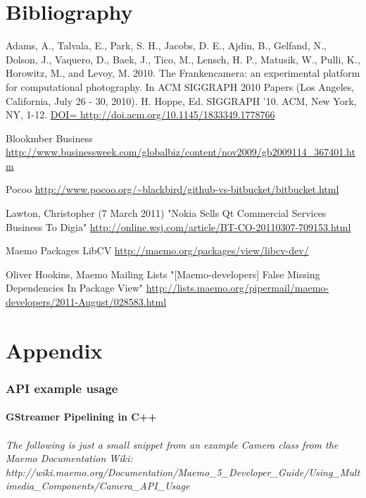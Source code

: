 \documentclass[11pt]{article} %
\begin{document}
\part{Bibliography}
\begin{thebibliography}{9}

 Adams, A., Talvala, E., Park, S. H., Jacobs, D. E., Ajdin, B., Gelfand, N., Dolson, J., Vaquero, D., Baek, J., Tico, M., Lensch, H. P., Matusik, W., Pulli, K., Horowitz, M., and Levoy, M.
2010. The Frankencamera: an experimental platform for computational photography.
In ACM SIGGRAPH 2010 Papers (Los Angeles, California, July 26 - 30, 2010).
H. Hoppe, Ed. SIGGRAPH '10. ACM, New York, NY, 1-12.
\url{DOI= http://doi.acm.org/10.1145/1833349.1778766}

 Blookmber Business
\url{http://www.businessweek.com/globalbiz/content/nov2009/gb2009114_367401.htm}

 Pocoo
\url{http://www.pocoo.org/~blackbird/github-vs-bitbucket/bitbucket.html}

 Lawton, Christopher (7 March 2011)
"Nokia Sells Qt Commercial Services Business To Digia"
\url{http://online.wsj.com/article/BT-CO-20110307-709153.html}

 Maemo Packages
LibCV
\url{http://maemo.org/packages/view/libcv-dev/}

 Oliver Hookins, Maemo Mailing Lists
"[Maemo-developers] False Missing Dependencies In Package View"
\url{http://lists.maemo.org/pipermail/maemo-developers/2011-August/028583.html}


\end{thebibliography}

\part{Appendix}
\section{API example usage}
\subsection{GStreamer Pipelining in C++}
\paragraph{ The following is just a small snippet from an example Camera class from the Maemo Documentation Wiki:
http://wiki.maemo.org/Documentation/Maemo\_5\_Developer\_Guide/Using\_Multimedia\_Components/Camera\_API\_Usage}

\end{document}
